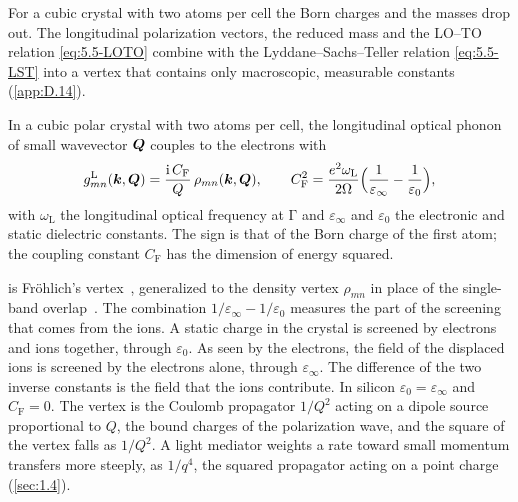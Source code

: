 For a cubic crystal with two atoms per cell the Born charges and the masses drop out. The longitudinal polarization vectors, the reduced mass and the LO--TO relation \cref{eq:5.5-LOTO} combine with the Lyddane--Sachs--Teller relation \cref{eq:5.5-LST} into a vertex that contains only macroscopic, measurable constants (\cref{app:D.14}).
\begin{keyresult}
In a cubic polar crystal with two atoms per cell, the longitudinal optical phonon of small wavevector $\bm{Q}$ couples to the electrons with
\begin{equation}
  g^{\mathrm{L}}_{mn}(\bm{k},\bm{Q}) = \frac{\mathrm{i}\,C_{\mathrm{F}}}{Q}\,\rho_{mn}(\bm{k},\bm{Q}) , \qquad
  C_{\mathrm{F}}^2 = \frac{e^2\omega_{\mathrm{L}}}{2\Omega}\Bigl(\frac{1}{\varepsilon_\infty} - \frac{1}{\varepsilon_0}\Bigr) ,
  \label{eq:6.2-frohlich}
\end{equation}
with $\omega_{\mathrm{L}}$ the longitudinal optical frequency at $\mathrm{\Gamma}$ and $\varepsilon_\infty$ and $\varepsilon_0$ the electronic and static dielectric constants. The sign is that of the Born charge of the first atom; the coupling constant $C_{\mathrm{F}}$ has the dimension of energy squared.
\end{keyresult}
 is Fr\"ohlich's vertex~\cite{frohlich1954electrons}, generalized to the density vertex $\rho_{mn}$ in place of the single-band overlap~\cite[Eq.~(1)]{verdi2015frohlich}. The combination $1/\varepsilon_\infty - 1/\varepsilon_0$ measures the part of the screening that comes from the ions. A static charge in the crystal is screened by electrons and ions together, through $\varepsilon_0$. As seen by the electrons, the field of the displaced ions is screened by the electrons alone, through $\varepsilon_\infty$. The difference of the two inverse constants is the field that the ions contribute. In silicon $\varepsilon_0 = \varepsilon_\infty$ and $C_{\mathrm{F}} = 0$. The vertex is the Coulomb propagator $1/Q^2$ acting on a dipole source proportional to $Q$, the bound charges of the polarization wave, and the square of the vertex falls as $1/Q^2$. A light mediator weights a rate toward small momentum transfers more steeply, as $1/q^4$, the squared propagator acting on a point charge (\cref{sec:1.4}).

